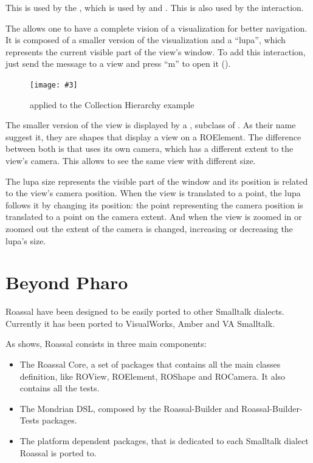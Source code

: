 \documentclass[a4paper,10pt,twoside]{book}
\newcommand{\fig}[4]{
		\begin{figure}[#1]
			\centering
			\texttt{[image: \#3]}
			\caption{\label{fig:#3}#4}
		\end{figure}}
\begin{document}
This is used by the , which is used by  and . This is also used by the  interaction.

The  allows one to have a complete vision of a visualization for better navigation. It is composed of a smaller version of the visualization and a ``lupa'', which represents the current visible part of the view's window. To add this interaction, just send the  message to a view and press ``m'' to open it (). 

\fig{H}{0.9}{miniMap}{ applied to the Collection Hierarchy example}

The smaller version of the view is displayed by a , subclass of . 
As their name suggest it, they are shapes that display a view on a ROElement. The difference between both is that  uses its own camera, which has a different extent to the view's camera. This allows  to see the same view with different size. 

The lupa  size represents the visible part of the window and its position is related to the view's camera position. When the view is translated to a point, the lupa follows it by changing its position: the point representing the camera position is translated to a point on the  camera extent. And when the view is zoomed in or zoomed out the extent of the camera is changed, increasing or decreasing the lupa's size.




\section{Beyond Pharo}

Roassal have been designed to be easily ported to other Smalltalk dialects. Currently it has been ported to VisualWorks, Amber and VA Smalltalk.

As  shows, Roassal consists in three main components:

\begin{itemize}
\item  The Roassal Core, a set of packages that contains all the main classes definition, like ROView, ROElement, ROShape and ROCamera. It also contains all the tests.
\item The Mondrian DSL, composed by the Roassal-Builder and Roassal-Builder-Tests packages.
\item The platform dependent packages, that is dedicated to each Smalltalk dialect Roassal is ported to.
\end{itemize} 
\end{document}
